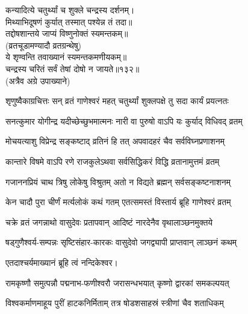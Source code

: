 \begin{center}
कन्यादित्ये चतुर्थ्यां च शुक्ले चन्द्रस्य दर्शनम्।\\
मिथ्याभिदूषणं कुर्यात् तस्मात् पश्येन्न तं तदा॥\\
तद्दोषशान्तये जाप्यं विष्णुनोक्तं स्यमन्तकम्॥\\
(व्रतचूडामण्यादौ व्रतग्रन्थेषु)\\

ये शृण्वन्ति तवाख्यानं स्यमन्तकमणीयकम्॥ \\
चन्द्रस्य चरितं सर्वं तेषां दोषो न जायते॥१३२॥\\
(अत्रैव अग्रे उपाख्याने)\\



\twolineshloka
{शृणुष्वैकाग्रचित्तः सन् व्रतं गाणेश्वरं महत्}
{चतुर्थ्यां शुक्लपक्षे तु सदा कार्यं प्रयत्नतः}%

\twolineshloka
{सनत्कुमार योगीन्द्र यदीच्छेच्छुभमात्मनः}
{नारी वा पुरुषो वाऽपि यः कुर्याद् विधिवद् व्रतम्}%

\twolineshloka
{मोचयत्याशु विप्रेन्द्र सङ्कष्टाद् व्रतिनं हि तत्}
{अपवादहरं चैव सर्वविघ्नप्रणाशनम्}%

\twolineshloka
{कान्तारे विषमे वाऽपि रणे राजकुलेऽथवा}
{सर्वसिद्धिकरं विद्धि व्रतानामुत्तमं व्रतम्}%

\twolineshloka
{गजाननप्रियं चाथ त्रिषु लोकेषु विश्रुतम्}
{अतो न विद्यते ब्रह्मन् सर्वसङ्कष्टनाशनम्}%


\twolineshloka
{केन चादौ पुरा चीर्णं मर्त्यलोकं कथं गतम्}
{एतत्समस्तं विस्तार्य ब्रूहि गाणेश्वरं व्रतम्}%

\twolineshloka
{चक्रे व्रतं जगन्नाथो वासुदेवः प्रतापवान्}
{आदिष्टं नारदेनैव वृथालाञ्छनमुक्तये}%

\twolineshloka
{षड्गुणैश्वर्य-सम्पन्नः सृष्टिसंहार-कारकः} 
{वासुदेवो जगद्व्यापी प्राप्तवान् लाञ्छनं कथम्}%

एतदाश्चर्यमाख्यानं ब्रूहि त्वं नन्दिकेश्वर।


\twolineshloka
{रामकृष्णौ समुत्पन्नौ पद्मनाभ-फणीश्वरौ}
{जरासन्धभयात् कृष्णो द्वारकां समकल्पयत्}%

\twolineshloka
{विश्वकर्माणमाहूय पुरीं हाटकनिर्मिताम्}
{तत्र षोडशसाहस्रं स्त्रीणां चैव शताधिकम्}%


\end{center}
